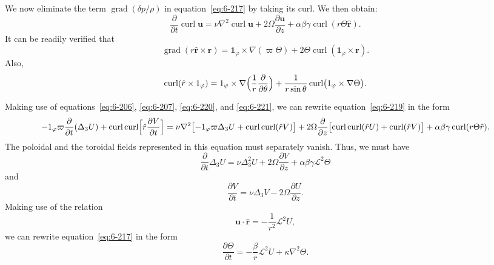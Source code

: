 We now eliminate the term $\operatorname{grad}(\delta p/\rho)$ in equation~\eqref{eq:6-217} by taking its
curl. We then obtain:
\begin{equation}\label{eq:6-219}
\frac{\partial}{\partial t}\operatorname{curl}\boldsymbol{u} = \nu\nabla^2\operatorname{curl}\boldsymbol{u} + 2\Omega\frac{\partial\boldsymbol{u}}{\partial z} + \alpha\beta\gamma\operatorname{curl}(r\Theta\hat{\boldsymbol{r}}).
\end{equation}
It can be readily verified that
\begin{equation}\label{eq:6-220}
\operatorname{grad}(r\hat{\boldsymbol{r}}\times\boldsymbol{r}) = \mathbf{1}_\varphi\times\nabla(\varpi\Theta) + 2\Theta\operatorname{curl}(\mathbf{1}_\varphi\times\boldsymbol{r}).
\end{equation}
Also,
\begin{equation}\label{eq:6-221}
\operatorname{curl}(\hat{\boldsymbol{r}}\times\mathbf{1}_\varphi) = \mathbf{1}_\varphi \times\nabla\Bigl(\frac{1}{r}\frac{\partial}{\partial\theta}\Bigr) + \frac{1}{r\sin\theta}\operatorname{curl}\bigl(\mathbf{1}_\varphi\times\nabla\Theta\bigr).
\end{equation}

Making use of equations~\eqref{eq:6-206}, \eqref{eq:6-207}, \eqref{eq:6-220}, and \eqref{eq:6-221}, we can rewrite
equation~\eqref{eq:6-219} in the form
\begin{equation}\label{eq:6-222}
-\mathbf{1}_\varphi\varpi\frac{\partial}{\partial t}(\Delta_3 U) + \operatorname{curl}\operatorname{curl}\Bigl[\hat{\boldsymbol{r}}\frac{\partial V}{\partial t}\Bigr] = \nu\nabla^2\bigl[-\mathbf{1}_\varphi\varpi\Delta_3 U + \operatorname{curl}\operatorname{curl}(\hat{\boldsymbol{r}}V)\bigr] + 2\Omega\frac{\partial}{\partial z}\bigl[\operatorname{curl}\operatorname{curl}(\hat{\boldsymbol{r}}U) + \operatorname{curl}(\hat{\boldsymbol{r}}V)\bigr] + \alpha\beta\gamma\operatorname{curl}(r\Theta\hat{\boldsymbol{r}}).
\end{equation}
The poloidal and the toroidal fields represented in this equation must
separately vanish. Thus, we must have
\begin{equation}\label{eq:6-223}
\frac{\partial}{\partial t}\Delta_3 U = \nu\Delta_3^2 U + 2\Omega\frac{\partial V}{\partial z} + \alpha\beta\gamma\mathscr{L}^2\Theta
\end{equation}
and
\begin{equation}\label{eq:6-224}
\frac{\partial V}{\partial t} = \nu\Delta_3 V - 2\Omega\frac{\partial U}{\partial z}.
\end{equation}
Making use of the relation
\begin{equation}\label{eq:6-225}
\boldsymbol{u}\cdot\hat{\boldsymbol{r}} = -\frac{1}{r^2}\mathscr{L}^2 U,
\end{equation}
we can rewrite equation~\eqref{eq:6-217} in the form
\begin{equation}\label{eq:6-226}
\frac{\partial\Theta}{\partial t} = -\frac{\beta}{r}\mathscr{L}^2 U + \kappa\nabla^2\Theta.
\end{equation}

